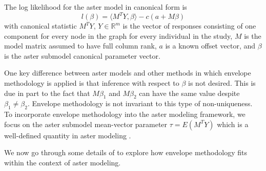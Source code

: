 \documentclass[12pt]{article}
\newcommand{\R}{\mathbb{R}}
\newcommand{\E}{\text{E}}
\begin{document}
The log likelihood for the aster model in canonical form is
$$ 
  l(\beta) = \langle M^TY, \beta \rangle - c(a + M\beta)
$$  
with canonical statistic $M^TY$, $Y \in \R^m$ is the vector of responses 
consisting of one component for every node in the graph for every individual 
in the study, $M$ is the model matrix assumed to have full column rank, $a$ is 
a known offset vector, and $\beta$ is the aster submodel canonical parameter 
vector. 

One key difference between aster models and other methods in which envelope 
methodology is applied is that inference with respect to $\beta$ is not 
desired. This is due in part to the fact that $M\beta_1$ and $M\beta_2$ can 
have the same value despite $\beta_1 \neq \beta_2$. Envelope methodology is 
not invariant to this type of non-uniqueness. To incorporate envelope 
methodology into the aster modeling framework, we focus on the aster submodel 
mean-vector parameter $\tau = E(M^TY)$ which is a well-defined quantity in 
aster modeling \citep*{geyer-phil, eck-asterenv}.


We now go through some details of \citet*[Example 1]{eck-asterenv} to explore 
how envelope methodology fits within the context of aster modeling.

\end{document}
